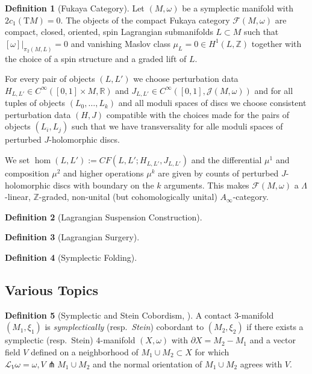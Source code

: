 \documentclass[a4paper]{article}
\newcommand{\RR}{\mathbb{R}}
\newcommand{\ZZ}{\mathbb{Z}}
\newcommand{\mcF}{\mathcal F}
\newcommand{\mcJ}{\mathcal J}
\newcommand{\mcL}{\mathcal L}
\newcommand{\del}{\partial}
\newcommand{\cin}{C^{\infty}}
\newcommand{\ts}{\mathrm{T}}
\theoremstyle{definition}
\theoremstyle{definition}
\newtheorem{definition}{Definition}
\theoremstyle{remark}
\theoremstyle{remark}
\begin{document}
\begin{definition}[Fukaya Category]
  Let $(M,\omega)$ be a symplectic manifold with $2c_1(\ts M)=0$. The objects of the compact Fukaya category $\mcF(M,\omega)$ are compact, closed, oriented, spin Lagrangian submanifolds $L\subset M$ such that $[\omega]|_{\pi_2(M,L)}=0$ and vanishing Maslov class $\mu_L=0\in H^1(L,\ZZ)$ together with the choice of a spin structure and a graded lift of $L$.

For every pair of objects $(L,L')$ we choose perturbation data $H_{L,L'}\in\cin([0,1]\times M,\RR)$ and $J_{L,L'}\in\cin([0,1],\mcJ(M,\omega))$ and for all tuples of objects $(L_0,\ldots,L_k)$ and all moduli spaces of discs we choose consistent perturbation data $(H,J)$ compatible with the choices made for the pairs of objects $(L_i,L_j)$ such that we have transversality for alle moduli spaces of perturbed $J$-holomorphic discs.

We set $\hom(L,L'):=CF(L,L';H_{L,L'},J_{L,L'})$ and the differential $\mu^1$ and composition $\mu^2$ and higher operations $\mu^k$ are given by counts of perturbed $J$-holomorphic discs with boundary on the $k$ arguments. This makes $\mcF(M,\omega)$ a $\Lambda$-linear, $\ZZ$-graded, non-unital (but cohomologically unital) $A_{\infty}$-category.
\end{definition}

\begin{definition}[Lagrangian Suspension Construction]
  
\end{definition}

\begin{definition}[Lagrangian Surgery]
  
\end{definition}

\begin{definition}[Symplectic Folding]
  
\end{definition}

\subsection{Various Topics}

\begin{definition}[Symplectic and Stein Cobordism, \cite{Etnyre2002}]
  A contact $3$-manifold $(M_1,\xi_1)$ is \emph{symplectically} (resp.\ \emph{Stein}) cobordant to $(M_2,\xi_2)$ if there exists a symplectic (resp.\ Stein) $4$-manifold $(X,\omega)$ with $\del X=M_2-M_1$ and a vector field $V$ defined on a neighborhood of $M_1\cup M_2\subset X$ for which $\mcL_V\omega=\omega, V\pitchfork M_1\cup M_2$ and the normal orientation of $M_1\cup M_2$ agrees with $V$.
\end{definition}
\end{document}
